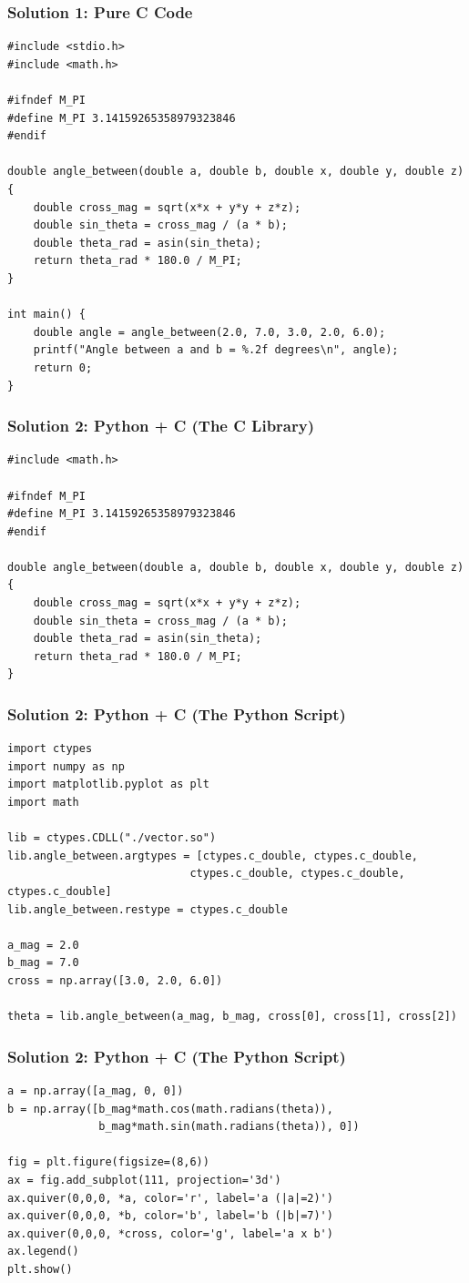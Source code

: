 \documentclass{beamer}
\begin{document}
\begin{frame}[fragile]
    \frametitle{Solution 1: Pure C Code}
    \begin{lstlisting}
#include <stdio.h>
#include <math.h>

#ifndef M_PI
#define M_PI 3.14159265358979323846
#endif

double angle_between(double a, double b, double x, double y, double z) {
    double cross_mag = sqrt(x*x + y*y + z*z);
    double sin_theta = cross_mag / (a * b);
    double theta_rad = asin(sin_theta);
    return theta_rad * 180.0 / M_PI;
}

int main() {
    double angle = angle_between(2.0, 7.0, 3.0, 2.0, 6.0);
    printf("Angle between a and b = %.2f degrees\n", angle);
    return 0;
}
    \end{lstlisting}
\end{frame}

\begin{frame}[fragile]
    \frametitle{Solution 2: Python + C (The C Library)}
        \begin{lstlisting}
#include <math.h>

#ifndef M_PI
#define M_PI 3.14159265358979323846
#endif

double angle_between(double a, double b, double x, double y, double z) {
    double cross_mag = sqrt(x*x + y*y + z*z);
    double sin_theta = cross_mag / (a * b);
    double theta_rad = asin(sin_theta);
    return theta_rad * 180.0 / M_PI;
}
    \end{lstlisting}
\end{frame}

\begin{frame}[fragile]
    \frametitle{Solution 2: Python + C (The Python Script)}
    \begin{lstlisting}
import ctypes
import numpy as np
import matplotlib.pyplot as plt
import math

lib = ctypes.CDLL("./vector.so")
lib.angle_between.argtypes = [ctypes.c_double, ctypes.c_double,
                            ctypes.c_double, ctypes.c_double, ctypes.c_double]
lib.angle_between.restype = ctypes.c_double

a_mag = 2.0
b_mag = 7.0
cross = np.array([3.0, 2.0, 6.0])

theta = lib.angle_between(a_mag, b_mag, cross[0], cross[1], cross[2])
    \end{lstlisting}
\end{frame}


\begin{frame}[fragile]
    \frametitle{Solution 2: Python + C (The Python Script)}
     \begin{lstlisting}
a = np.array([a_mag, 0, 0])
b = np.array([b_mag*math.cos(math.radians(theta)),
              b_mag*math.sin(math.radians(theta)), 0])

fig = plt.figure(figsize=(8,6))
ax = fig.add_subplot(111, projection='3d')
ax.quiver(0,0,0, *a, color='r', label='a (|a|=2)')
ax.quiver(0,0,0, *b, color='b', label='b (|b|=7)')
ax.quiver(0,0,0, *cross, color='g', label='a x b')
ax.legend()
plt.show()
    \end{lstlisting}
\end{frame}
\end{document}
